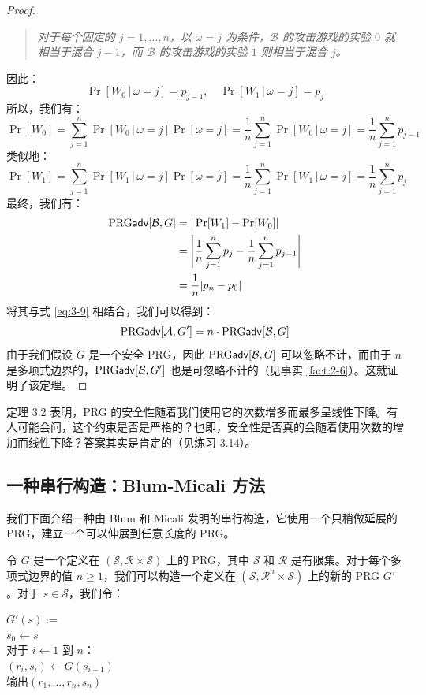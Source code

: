 \begin{proof}
\begin{quote}
\emph{对于每个固定的 $j=1,\dots,n$，以 $\omega=j$ 为条件，$\mathcal B$ 的攻击游戏的实验 $0$ 就相当于混合 $j-1$，而 $\mathcal B$ 的攻击游戏的实验 $1$ 则相当于混合 $j$。
}
\end{quote}
因此：
$$
\Pr[W_0\,|\,\omega=j]=p_{j-1},\quad
\Pr[W_1\,|\,\omega=j]=p_{j}
$$
所以，我们有：
$$
\Pr[W_0]
=\sum_{j=1}^n\Pr[W_0\,|\,\omega=j]\Pr[\omega=j]
=\frac{1}{n}\sum_{j=1}^n\Pr[W_0\,|\,\omega=j]
=\frac{1}{n}\sum_{j=1}^np_{j-1}
$$
类似地：
$$
\Pr[W_1]
=\sum_{j=1}^n\Pr[W_1\,|\,\omega=j]\Pr[\omega=j]
=\frac{1}{n}\sum_{j=1}^n\Pr[W_1\,|\,\omega=j]
=\frac{1}{n}\sum_{j=1}^np_{j}
$$
最终，我们有：
$$
\begin{aligned}
{\rm PRG\mathsf{adv}}[\mathcal{B},G]
&=|\Pr[W_1]-\Pr[W_0]|\\
&=\Bigg\lvert\frac{1}{n}\sum_{j=1}^np_j-\frac{1}{n}\sum_{j=1}^np_{j-1}\Bigg\rvert\\
&=\frac{1}{n}|p_n-p_0|
\end{aligned}
$$
将其与式 \ref{eq:3-9} 相结合，我们可以得到：
$$
{\rm PRG\mathsf{adv}}[\mathcal{A},G']=n\cdot{\rm PRG\mathsf{adv}}[\mathcal{B},G]
$$
由于我们假设 $G$ 是一个安全 PRG，因此 ${\rm PRG\mathsf{adv}}[\mathcal{B},G]$ 可以忽略不计，而由于 $n$ 是多项式边界的，${\rm PRG\mathsf{adv}}[\mathcal{B},G']$ 也是可忽略不计的（见事实 \ref{fact:2-6}）。这就证明了该定理。
\end{proof}

定理 3.2 表明，PRG 的安全性随着我们使用它的次数增多而最多呈线性下降。有人可能会问，这个约束是否是严格的？也即，安全性是否真的会随着使用次数的增加而线性下降？答案其实是肯定的（见练习 3.14）。

\subsection{一种串行构造：Blum-Micali 方法}\label{subsec:3-4-2}

我们下面介绍一种由 Blum 和 Micali 发明的串行构造，它使用一个只稍做延展的 PRG，建立一个可以伸展到任意长度的 PRG。

令 $G$ 是一个定义在 $(\mathcal{S},\mathcal{R}\times\mathcal{S})$ 上的 PRG，其中 $\mathcal S$ 和 $\mathcal R$ 是有限集。对于每个多项式边界的值 $n\geq 1$，我们可以构造一个定义在 $(\mathcal{S},\mathcal{R}^n\times\mathcal{S})$ 上的新的 PRG $G'$。对于 $s\in\mathcal{S}$，我们令：

\vspace*{5pt}

\hspace*{5pt} $G'(s):=$\\
\hspace*{50pt} $s_0\leftarrow s$\\
\hspace*{50pt} 对于 $i\leftarrow1$ 到 $n$：\\
\hspace*{75pt} $(r_i,s_i)\leftarrow G(s_{i-1})$\\
\hspace*{50pt} 输出$(r_1,\dots,r_n,s_n)$

